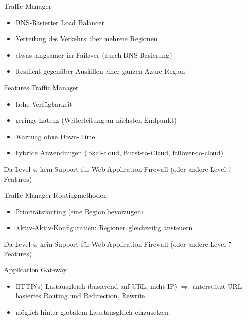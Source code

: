 \begin{flashcard}[]{Traffic Manager}
  \begin{itemize}
    \item DNS-Basierter Load Balancer
    \item Verteilung des Verkehrs über mehrere Regionen
    \item etwas langsamer im Failover (durch DNS-Basierung)
    \item Resilient gegenüber Ausfällen einer ganzen Azure-Region
  \end{itemize}
\end{flashcard}

\begin{flashcard}[]{Features Traffic Manager}
  \begin{itemize}
    \item hohe Verfügbarkeit
    \item geringe Latenz (Weiterleitung an nächsten Endpunkt)
    \item Wartung ohne Down-Time
    \item hybride Anwendungen (lokal-cloud, Burst-to-Cloud, failover-to-cloud)
  \end{itemize}
  Da Level-4, kein Support für Web Application Firewall (oder andere Level-7-Features)
\end{flashcard}

\begin{flashcard}[]{Traffic Manager-Routingmethoden}
  \begin{itemize}
    \item Prioritätsrouting (eine Region bevorzugen)
    \item Aktiv-Aktiv-Konfiguration: Regionen gleichzeitig ansteuern
  \end{itemize}
  Da Level-4, kein Support für Web Application Firewall (oder andere Level-7-Features)
\end{flashcard}

\begin{flashcard}[]{Application Gateway}
  \begin{itemize}
    \item HTTP(s)-Lastausgleich (basierend auf URL, nicht IP)\newline
      $\Rightarrow$ unterstützt URL-basiertes Routing und Redirection, Rewrite
    \item möglich hinter globalem Laustausgleich einzusetzen
  \end{itemize}
\end{flashcard}

